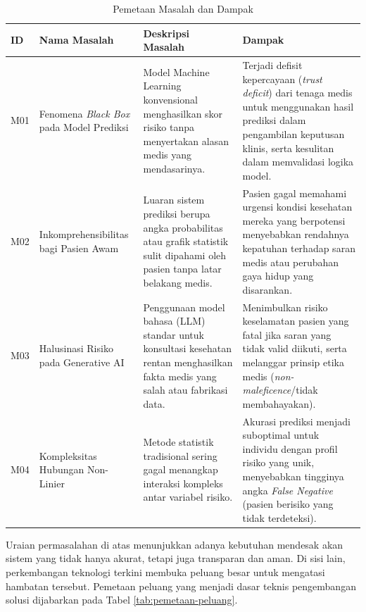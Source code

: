 \begin{table}[ht]
    \caption{Pemetaan Masalah dan Dampak}
    \label{tab:pemetaan-masalah}
    \centering
    \small
    \begin{tabular}{|p{1cm}|p{2.5cm}|p{3.5cm}|p{6cm}|}
        \hline
        \textbf{ID} & \textbf{Nama Masalah} &\textbf{Deskripsi Masalah} & \textbf{Dampak} \\
        \hline
        M01 & Fenomena \textit{Black Box} pada Model Prediksi & Model Machine Learning konvensional menghasilkan skor risiko tanpa menyertakan alasan medis yang mendasarinya. & Terjadi defisit kepercayaan (\textit{trust deficit}) dari tenaga medis untuk menggunakan hasil prediksi dalam pengambilan keputusan klinis, serta kesulitan dalam memvalidasi logika model. \\
        \hline
        M02 & Inkomprehensibilitas bagi Pasien Awam & Luaran sistem prediksi berupa angka probabilitas atau grafik statistik sulit dipahami oleh pasien tanpa latar belakang medis. & Pasien gagal memahami urgensi kondisi kesehatan mereka yang berpotensi menyebabkan rendahnya kepatuhan terhadap saran medis atau perubahan gaya hidup yang disarankan. \\
        \hline
        M03 & Halusinasi Risiko pada Generative AI & Penggunaan model bahasa (LLM) standar untuk konsultasi kesehatan rentan menghasilkan fakta medis yang salah atau fabrikasi data. & Menimbulkan risiko keselamatan pasien yang fatal jika saran yang tidak valid diikuti, serta melanggar prinsip etika medis (\textit{non-maleficence}/tidak membahayakan). \\
        \hline
        M04 & Kompleksitas Hubungan Non-Linier & Metode statistik tradisional sering gagal menangkap interaksi kompleks antar variabel risiko. & Akurasi prediksi menjadi suboptimal untuk individu dengan profil risiko yang unik, menyebabkan tingginya angka \textit{False Negative} (pasien berisiko yang tidak terdeteksi). \\
        \hline
    \end{tabular}
\end{table}

Uraian permasalahan di atas menunjukkan adanya kebutuhan mendesak akan sistem yang tidak hanya akurat, tetapi juga transparan dan aman. Di sisi lain, perkembangan teknologi terkini membuka peluang besar untuk mengatasi hambatan tersebut. Pemetaan peluang yang menjadi dasar teknis pengembangan solusi dijabarkan pada Tabel \ref{tab:pemetaan-peluang}.

